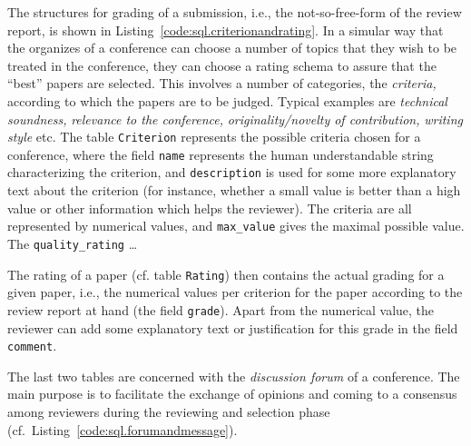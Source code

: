 The structures for grading of a submission, i.e., the not-so-free-form of
the review report, is shown in Listing~\ref{code:sql.criterionandrating}.
In a simular way that the organizes of a conference can choose a number of
topics that they wish to be treated in the conference, they can choose a
rating schema to assure that the ``best'' papers are selected.
%
This involves a number of categories, the \emph{criteria,} according to
which the papers are to be judged. Typical examples are \emph{technical
  soundness,} \emph{relevance to the conference,} \emph{originality/novelty
  of contribution,} \emph{writing style} etc. The table \texttt{Criterion}
represents the possible criteria chosen for a conference, where the field
\texttt{name} represents the human understandable string characterizing the
criterion, and \texttt{description} is used for some more explanatory text
about the criterion (for instance, whether a small value is better than a
high value or other information which helps the reviewer). The criteria are
all represented by numerical values, and \texttt{max\_value} gives the
maximal possible value. The \texttt{quality\_rating} \ldots

The rating of a paper (cf. table \texttt{Rating}) then contains the actual
grading for a given paper, i.e., the numerical values per criterion for the
paper according to the review report at hand (the field \texttt{grade}).
Apart from the numerical value, the reviewer can add some explanatory text
or justification for this grade in the field \texttt{comment}.


%


\medskip

The last two tables are concerned with the \emph{discussion forum} of a
conference. The main purpose is to facilitate the exchange of opinions and
coming to a consensus among reviewers during the reviewing and selection
phase (cf.\ Listing~\ref{code:sql.forumandmessage}).

%


%



%



%

